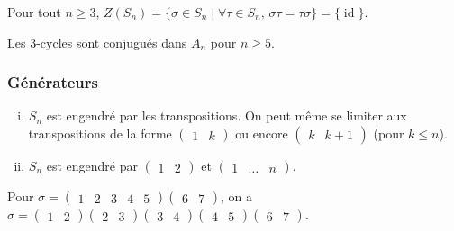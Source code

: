 	
	\begin{proposition}
		Pour tout $n \geq 3$, $Z(S_n) = \{ \sigma \in S_n \mid \forall \tau \in S_n, \, \sigma \tau = \tau \sigma \} = \{ \operatorname{id} \}$.
	\end{proposition}
	

	\begin{lemma}
		Les $3$-cycles sont conjugués dans $A_n$ pour $n \geq 5$.
	\end{lemma}
	
	\subsubsection{Générateurs}
	
	
	\begin{proposition}
		\begin{enumerate}[(i)]
			\item $S_n$ est engendré par les transpositions. On peut même se limiter aux transpositions de la forme $\begin{pmatrix} 1 & k \end{pmatrix}$ ou encore  $\begin{pmatrix} k & k+1 \end{pmatrix}$ (pour $k \leq n$).
			\item $S_n$ est engendré par $\begin{pmatrix} 1 & 2 \end{pmatrix}$ et $\begin{pmatrix} 1 & \dots & n \end{pmatrix}$.
		\end{enumerate}
	\end{proposition}
	
	\begin{example}
		Pour $\sigma = \begin{pmatrix} 1 & 2 & 3 & 4 & 5 \end{pmatrix}\begin{pmatrix} 6 & 7 \end{pmatrix}$, on a $\sigma = \begin{pmatrix} 1 & 2 \end{pmatrix} \begin{pmatrix} 2 & 3 \end{pmatrix} \begin{pmatrix} 3 & 4 \end{pmatrix} \begin{pmatrix} 4 & 5 \end{pmatrix} \begin{pmatrix} 6 & 7 \end{pmatrix}$.
	\end{example}
	
